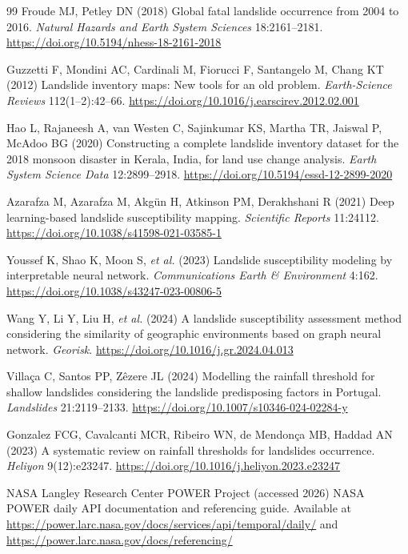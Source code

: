 \documentclass[pdflatex,sn-mathphys-num]{sn-jnl}
\begin{document}
\begin{thebibliography}{99}
Froude MJ, Petley DN (2018) Global fatal landslide occurrence from 2004 to 2016. \textit{Natural Hazards and Earth System Sciences} 18:2161--2181. \url{https://doi.org/10.5194/nhess-18-2161-2018}

Guzzetti F, Mondini AC, Cardinali M, Fiorucci F, Santangelo M, Chang KT (2012) Landslide inventory maps: New tools for an old problem. \textit{Earth-Science Reviews} 112(1--2):42--66. \url{https://doi.org/10.1016/j.earscirev.2012.02.001}

Hao L, Rajaneesh A, van Westen C, Sajinkumar KS, Martha TR, Jaiswal P, McAdoo BG (2020) Constructing a complete landslide inventory dataset for the 2018 monsoon disaster in Kerala, India, for land use change analysis. \textit{Earth System Science Data} 12:2899--2918. \url{https://doi.org/10.5194/essd-12-2899-2020}

Azarafza M, Azarafza M, Akg\"un H, Atkinson PM, Derakhshani R (2021) Deep learning-based landslide susceptibility mapping. \textit{Scientific Reports} 11:24112. \url{https://doi.org/10.1038/s41598-021-03585-1}

Youssef K, Shao K, Moon S, \textit{et al.} (2023) Landslide susceptibility modeling by interpretable neural network. \textit{Communications Earth \& Environment} 4:162. \url{https://doi.org/10.1038/s43247-023-00806-5}

Wang Y, Li Y, Liu H, \textit{et al.} (2024) A landslide susceptibility assessment method considering the similarity of geographic environments based on graph neural network. \textit{Georisk}. \url{https://doi.org/10.1016/j.gr.2024.04.013}

Villa\c{c}a C, Santos PP, Z\^ezere JL (2024) Modelling the rainfall threshold for shallow landslides considering the landslide predisposing factors in Portugal. \textit{Landslides} 21:2119--2133. \url{https://doi.org/10.1007/s10346-024-02284-y}

Gonzalez FCG, Cavalcanti MCR, Ribeiro WN, de Mendon\c{c}a MB, Haddad AN (2023) A systematic review on rainfall thresholds for landslides occurrence. \textit{Heliyon} 9(12):e23247. \url{https://doi.org/10.1016/j.heliyon.2023.e23247}

NASA Langley Research Center POWER Project (accessed 2026) NASA POWER daily API documentation and referencing guide. Available at \url{https://power.larc.nasa.gov/docs/services/api/temporal/daily/} and \url{https://power.larc.nasa.gov/docs/referencing/}
\end{thebibliography}
\end{document}
